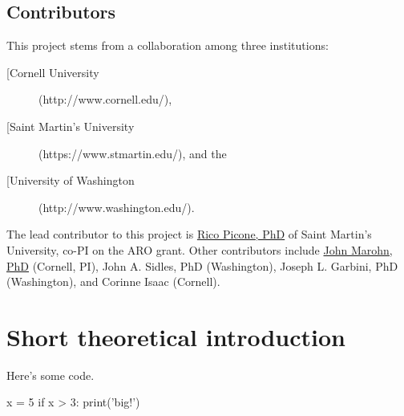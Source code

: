 \documentclass[%
oneside,                 %
final,                   %
10pt]{article}
\begin{document}
\subsection{Contributors}

This project stems from a collaboration among three institutions:

\begin{description}
\item[%
  [Cornell University](http://www.cornell.edu/),

\item[%
  [Saint Martin's University](https://www.stmartin.edu/), and the

\item[%
  [University of Washington](http://www.washington.edu/).
\end{description}

\noindent
The lead contributor to this project is \href{{http://ricopic.one}}{Rico Picone, PhD} of Saint Martin's University, co-PI on the ARO grant.
Other contributors include \href{{http://marohn.chem.cornell.edu/}}{John Marohn, PhD} (Cornell, PI), John A. Sidles, PhD (Washington), Joseph L. Garbini, PhD (Washington), and Corinne Isaac (Cornell).

\section{Short theoretical introduction}
\label{section:shorttheory}

Here's some code.

\bpycod
x = 5
if x > 3:
  print('big!')
\epycod








\end{document}
